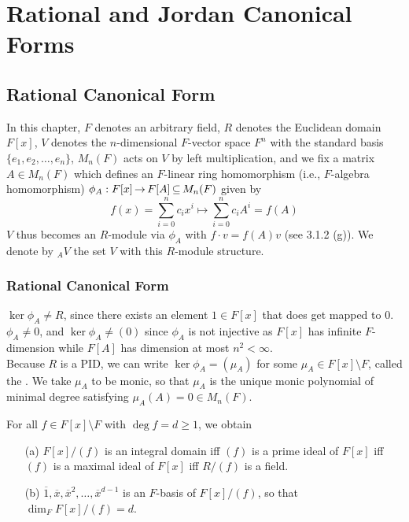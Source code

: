 \documentclass[11pt]{book}
\theoremstyle{definition}   \newtheorem{defn}[counter]{Definition} %
\newcommand{\ov}{\overline}   \newcommand{\wt}{\widetilde}
\newcommand{\bs}{\setminus}   \newcommand{\A}{\mathcal{A}}   \newcommand{\sy}{\textnormal{Syl}}   \newcommand{\size}[1]{\left| #1 \right|}
\DeclareMathOperator{\ra}{\rightarrow}   \DeclareMathOperator{\Poly}{\mathbf{P}}   \DeclareMathOperator{\spn}{\textnormal{span}}   \DeclareMathOperator{\aut}{\textnormal{Aut}}
\newcommand{\vs}{\vspace{8pt}}
\numberwithin{counter}{chapter}
\begin{document}
\part{Rational and Jordan Canonical Forms}





\chapter{Rational Canonical Form}

In this chapter, $F$ denotes an arbitrary field, $R$ denotes the Euclidean domain $F[x]$, $V$ denotes the $n$-dimensional $F$-vector space $F^n$ with the standard basis $\{e_1,e_2,\dots,e_n\}$, $M_n(F)$ acts on $V$ by left multiplication, and we fix a matrix $A \in M_n(F)$ which defines an $F$-linear ring homomorphism (i.e., $F$-algebra homomorphism) $\phi_A : F[x] \ra F[A] \sub M_n(F)$ given by
	\[f(x) = \sum_{i=0}^n c_i x^i \mapsto \sum_{i=0}^n c_i A^i = f(A) \]
$V$ thus becomes an $R$-module via $\phi_A$ with $f \cdot v = f(A) v$ (see 3.1.2 (g)). We denote by $_AV$ the set $V$ with this $R$-module structure.

\section{Rational Canonical Form}

\begin{remark}[+ Definition]
$\ker \phi_A \ne R$, since there exists an element $1 \in F[x]$ that does get mapped to 0.  $\phi_A \ne 0$, and $\ker \phi_A \ne (0)$ since $\phi_A$ is not injective as $F[x]$ has infinite $F$-dimension while $F[A]$ has dimension at most $n^2 < \infty$. \\

Because $R$ is a PID, we can write $\ker \phi_A = (\mu_A)$ for some $\mu_A \in F[x]\bs F$, called the . We take $\mu_A$ to be monic, so that $\mu_A$ is the unique monic polynomial of minimal degree satisfying $\mu_A(A) = 0 \in M_n(F)$.
\end{remark}

\vs

\begin{lemma}
For all $f \in F[x]\bs F$ with $\deg f = d \geq 1$, we obtain
\begin{enumerate}
\item[(a)] $F[x]/(f)$ is an integral domain iff $(f)$ is a prime ideal of $F[x]$ iff $(f)$ is a maximal ideal of $F[x]$ iff $R/(f)$ is a field.
\item[(b)] $\ov{1}, \ov{x}, \ov{x}^2,\dots,\ov{x}^{d-1}$ is an $F$-basis of $F[x]/(f)$, so that $\dim_F F[x]/(f) = d$.
\end{enumerate}
\end{lemma}
\end{document}
